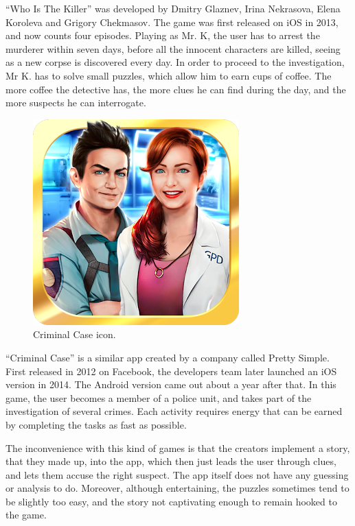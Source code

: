 \documentclass{mproj}
\begin{document}
``Who Is The Killer'' \cite{whoisthekiller} was developed by Dmitry Glaznev, Irina Nekrasova, Elena Koroleva and Grigory Chekmasov. The game was first released on iOS in 2013, and now counts four episodes. Playing as Mr. K, the user has to arrest the murderer within seven days, before all the innocent characters are killed, seeing as a new corpse is discovered every day. In order to proceed to the investigation, Mr K. has to solve small puzzles, which allow him to earn cups of coffee. The more coffee the detective has, the more clues he can find during the day, and the more suspects he can interrogate. \par

\begin{figure}
	\vspace{-10pt}
	\centering
	\includegraphics[scale=0.25]{images/criminalcase_icon}
	\caption{Criminal Case icon.}
	\vspace{-30pt}
\end{figure}

``Criminal Case'' \cite{criminalcase} is a similar app created by a company called Pretty Simple. First released in 2012 on Facebook, the developers team later launched an iOS version in 2014. The Android version came out about a year after that. In this game, the user becomes a member of a police unit, and takes part of the investigation of several crimes. Each activity requires energy that can be earned by completing the tasks as fast as possible.\\ \par

The inconvenience with this kind of games is that the creators implement a story, that they made up, into the app, which then just leads the user through clues, and lets them accuse the right suspect. The app itself does not have any guessing or analysis to do.
Moreover, although entertaining, the puzzles sometimes tend to be slightly too easy, and the story not captivating enough to remain hooked to the game.
\end{document}
